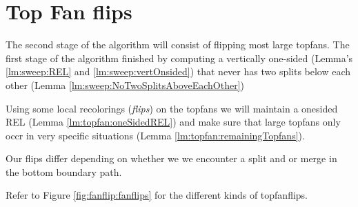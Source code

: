 
\section{Top Fan flips}
\label{s:fanflip}

The second stage of the algorithm will consist of flipping most large topfans. The first stage of the algorithm finished by computing a vertically one-sided \rel (Lemma's \ref{lm:sweep:REL} and \ref{lm:sweep:vertOnsided}) that never has two splits below each other (Lemma \ref{lm:sweep:NoTwoSplitsAboveEachOther})

Using some local recolorings (\emph{flips}) on the topfans we will maintain a onesided REL (Lemma \ref{lm:topfan:oneSidedREL}) and make sure that large topfans only occr in very specific situations (Lemma \ref{lm:topfan:remainingTopfans}).


Our flips differ depending on whether we we encounter a split and or merge in the bottom boundary path.


Refer to Figure \ref{fig:fanflip:fanflips} for the different kinds of topfanflips.


